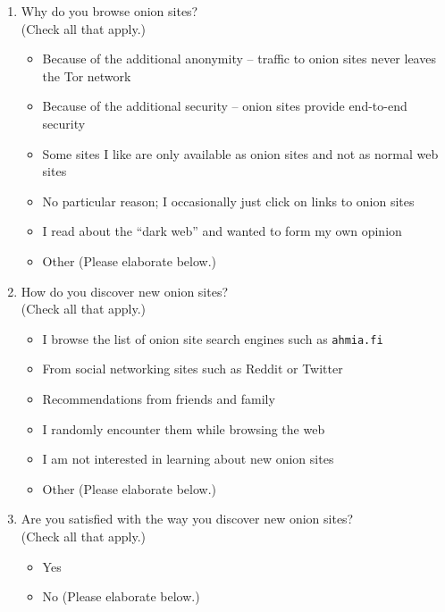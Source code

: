 \begin{enumerate}
    \item Why do you browse onion sites?\\(Check all that apply.)
        \begin{itemize}[label=$\Square$]
            \item Because of the additional anonymity -- traffic to onion sites
                never leaves the Tor network
            \item Because of the additional security -- onion sites provide
                end-to-end security
            \item Some sites I like are only available as onion sites and not
                as normal web sites
            \item No particular reason; I occasionally just click on links to
                onion sites
            \item I read about the ``dark web'' and wanted to form my own
                opinion
            \item Other (Please elaborate below.)
        \end{itemize}

    \item How do you discover new onion sites?\\(Check all that apply.)
        \begin{itemize}[label=$\Square$]
            \item I browse the list of onion site search engines such as
                \texttt{ahmia.fi}
            \item From social networking sites such as Reddit or Twitter
            \item Recommendations from friends and family
            \item I randomly encounter them while browsing the web
            \item I am not interested in learning about new onion sites
            \item Other (Please elaborate below.)
        \end{itemize}

    \item Are you satisfied with the way you discover new onion sites?\\(Check
        all that apply.)
        \begin{itemize}[label=$\Circle$]
            \item Yes
            \item No (Please elaborate below.)
        \end{itemize}


\end{enumerate}
